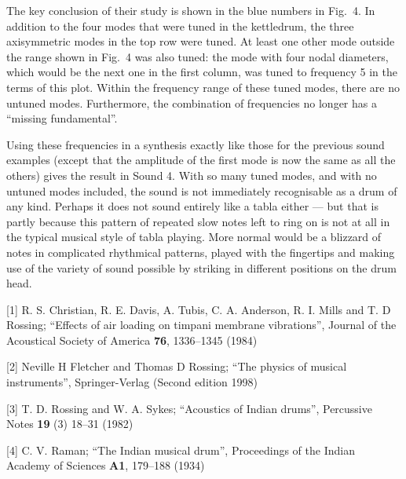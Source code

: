   The key conclusion of their study is shown in the blue numbers in Fig.\ 4. In 
  addition to the four modes that were tuned in the kettledrum, the three 
  axisymmetric modes in the top row were tuned. At least one other mode outside 
  the range shown in Fig.\ 4 was also tuned: the mode with four nodal 
  diameters, which would be the next one in the first column, was tuned to 
  frequency 5 in the terms of this plot. Within the frequency range of these 
  tuned modes, there are no untuned modes. Furthermore, the combination of 
  frequencies no longer has a ``missing fundamental''. 

  Using these frequencies in a synthesis exactly like those for the previous 
  sound examples (except that the amplitude of the first mode is now the same 
  as all the others) gives the result in Sound 4. With so many tuned modes, and 
  with no untuned modes included, the sound is not immediately recognisable as 
  a drum of any kind. Perhaps it does not sound entirely like a tabla either 
  --- but that is partly because this pattern of repeated slow notes left to 
  ring on is not at all in the typical musical style of tabla playing. More 
  normal would be a blizzard of notes in complicated rhythmical patterns, 
  played with the fingertips and making use of the variety of sound possible by 
  striking in different positions on the drum head. 



  \sectionreferences{}[1] R. S. Christian, R. E. Davis, A. Tubis, C. A. 
  Anderson, R. I. Mills and T. D Rossing; ``Effects of air loading on timpani 
  membrane vibrations'', Journal of the Acoustical Society of America 
  \textbf{76}, 1336--1345 (1984) 

  [2] Neville H Fletcher and Thomas D Rossing; ``The physics of musical 
  instruments'', Springer-Verlag (Second edition 1998) 

  [3] T. D. Rossing and W. A. Sykes; ``Acoustics of Indian drums'', Percussive 
  Notes \textbf{19} (3) 18--31 (1982) 

  [4] C. V. Raman; ``The Indian musical drum'', Proceedings of the Indian 
  Academy of Sciences \textbf{A1}, 179--188 (1934) 